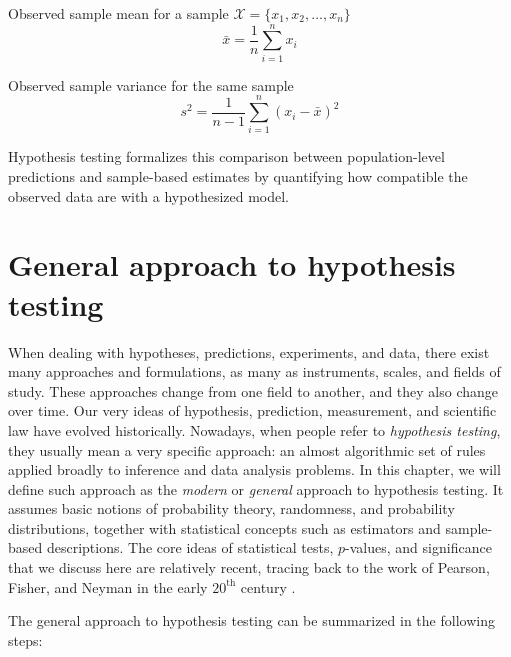 \medskip

Observed sample mean for a sample \(\mathcal{X} = \{x_1, x_2, \dots, x_n\}\)
\begin{equation}
    \bar{x} = \frac{1}{n}\sum_{i = 1}^{n} x_i
    \label{sample_mean}
\end{equation}

Observed sample variance for the same sample
\begin{equation}
    s^2 = \frac{1}{n - 1}\sum_{i = 1}^{n} (x_i - \bar{x})^2
    \label{sample_variance}
\end{equation}

\medskip

Hypothesis testing formalizes this comparison between population-level predictions and sample-based estimates by quantifying how compatible the observed data are with a hypothesized model.

\section{General approach to hypothesis testing}

When dealing with hypotheses, predictions, experiments, and data, there exist many approaches and formulations, as many as instruments, scales, and fields of study. These approaches change from one field to another, and they also change over time. Our very ideas of hypothesis, prediction, measurement, and scientific law have evolved historically. Nowadays, when people refer to \textit{hypothesis testing}, they usually mean a very specific approach: an almost algorithmic set of rules applied broadly to inference and data analysis problems. In this chapter, we will define such approach as the \textit{modern} or \textit{general} approach to hypothesis testing. It assumes basic notions of probability theory, randomness, and probability distributions, together with statistical concepts such as estimators and sample-based descriptions. The core ideas of statistical tests, \(p\)-values, and significance that we discuss here are relatively recent, tracing back to the work of Pearson, Fisher, and Neyman in the early $20^{\text{th}}$ century \cite{pearson_neyman_1933_efficient}.

\medskip

The general approach to hypothesis testing can be summarized in the following steps:

